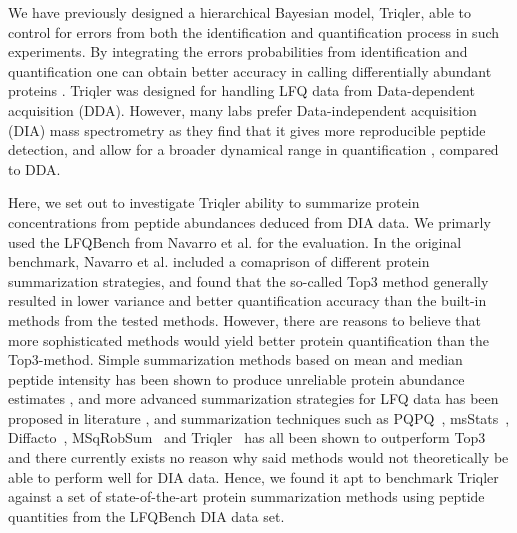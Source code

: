 \documentclass[10pt,letterpaper]{article}
\begin{document}
We have previously designed a hierarchical Bayesian model, Triqler, able to control for errors from both the identification and quantification process in such experiments\cite{The2018Integrated}. By integrating the errors probabilities from identification and quantification one can obtain better accuracy in calling differentially abundant proteins \cite{The2018Integrated}.   Triqler was designed for handling LFQ data from Data-dependent acquisition (DDA). However, many labs prefer Data-independent acquisition (DIA) mass spectrometry \cite{venable2004automated} as they find that it gives more reproducible peptide detection, and allow for a broader dynamical range in quantification \cite{bern2010deconvolution,zhang2020DIA}, compared to DDA. 

Here, we set out to investigate Triqler ability to summarize protein concentrations from peptide abundances deduced from DIA data. We primarly used the LFQBench from Navarro et al. \cite{navarro2016multicenter} for the evaluation. In the original benchmark, Navarro et al. included a comaprison of different protein summarization strategies, and found that the so-called Top3 method generally resulted in lower variance and better quantification accuracy than the built-in methods from the tested methods\cite{navarro2016multicenter}. However, there are reasons to believe that more sophisticated methods would yield better protein quantification than the Top3-method. Simple summarization methods based on mean and median peptide intensity has been shown to produce unreliable protein abundance estimates \cite{goeminne2015summarization}, and more advanced summarization strategies for LFQ data has been proposed in literature \cite{silva2006absolute,cox2014accurate}, and summarization techniques such as PQPQ~\cite{forshed2011enhanced}, msStats~\cite{choi2014msstats}, Diffacto~\cite{zhang2017covariation}, MSqRobSum~\cite{sticker2020robust} and Triqler~\cite{The2018Integrated} has all been shown to outperform Top3 and there currently exists no reason why said methods would not theoretically be able to perform well for DIA data. Hence, we found it apt to benchmark Triqler against a set of state-of-the-art protein summarization methods using peptide quantities from the LFQBench DIA data set.


 
\end{document}
